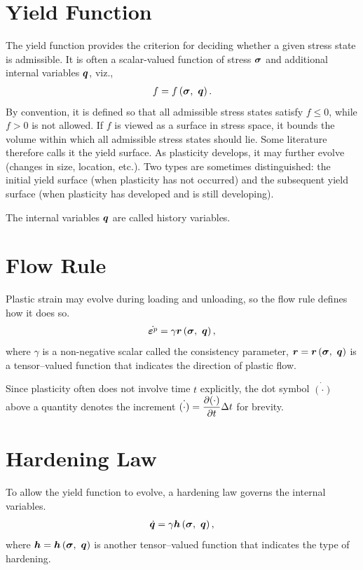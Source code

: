 \section{Yield Function}
The yield function provides the criterion for deciding whether a given stress state is admissible.
It is often a scalar-valued function of stress $\bm{\sigma}$ and additional internal variables $\bm{q}$, viz.,
\begin{gather}
f=f\left(\bm{\sigma},~\bm{q}\right).
\end{gather}
By convention, it is defined so that all admissible stress states satisfy $f\leqslant0$, while $f>0$ is not allowed.
If $f$ is viewed as a surface in stress space, it bounds the volume within which all admissible stress states should lie.
Some literature therefore calls it the yield surface.
As plasticity develops, it may further evolve (changes in size, location, etc.).
Two types are sometimes distinguished: the initial yield surface (when plasticity has not occurred) and the subsequent yield surface (when plasticity has developed and is still developing).

The internal variables $\bm{q}$ are called history variables.
\section{Flow Rule}
Plastic strain may evolve during loading and unloading, so the flow rule defines how it does so.
\begin{gather}\label{eq:general_flow_rule}
\dot{\bm{\varepsilon}^p}=\gamma\bm{r}\left(\bm{\sigma},~\bm{q}\right),
\end{gather}
where $\gamma$ is a non-negative scalar called the consistency parameter, $\bm{r}=\bm{r}\left(\bm{\sigma},~\bm{q}\right)$ is a tensor--valued function that indicates the direction of plastic flow.

Since plasticity often does not involve time $t$ explicitly, the dot symbol $\dot{\left(\cdot\right)}$ above a quantity denotes the increment $\dot{\left(\cdot\right)}=\dfrac{\partial{\left(\cdot\right)}}{\partial{t}}\Delta{}t$ for brevity.
\section{Hardening Law}
To allow the yield function to evolve, a hardening law governs the internal variables.
\begin{gather}
\dot{\bm{q}}=\gamma\bm{h}\left(\bm{\sigma},~\bm{q}\right),
\end{gather}
where $\bm{h}=\bm{h}\left(\bm{\sigma},~\bm{q}\right)$ is another tensor--valued function that indicates the type of hardening.

